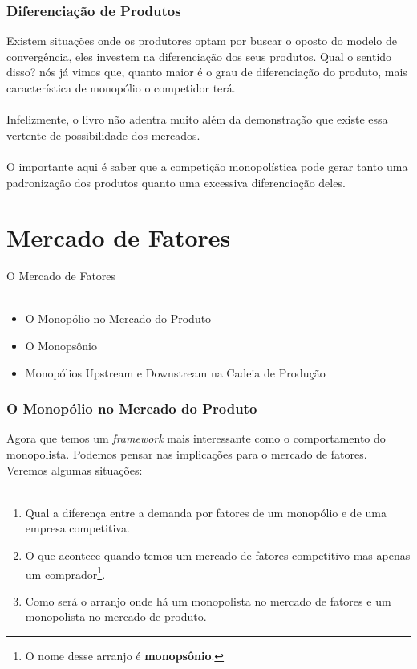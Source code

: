 \documentclass{beamer}[10]
\begin{document}

\begin{frame}
	\frametitle{Diferenciação de Produtos}

	Existem situações onde os produtores optam por buscar o oposto do modelo de convergência, eles investem na diferenciação dos seus produtos. Qual o sentido disso? nós já vimos que, quanto maior é o grau de diferenciação do produto, mais característica de monopólio o competidor terá.
	\\~\\
	Infelizmente, o livro não adentra muito além da demonstração que existe essa vertente de possibilidade dos mercados.
	\\~\\
	O importante aqui é saber que a competição monopolística pode gerar tanto uma padronização dos produtos quanto uma excessiva diferenciação deles.

\end{frame}

\section[M.Fatores]{Mercado de Fatores}

\begin{frame}
	\huge O Mercado de Fatores \normalsize
	\\~\\
	\begin{itemize}
		\item O Monopólio no Mercado do Produto
		\item O Monopsônio
		\item Monopólios Upstream e Downstream na Cadeia de Produção
	\end{itemize}
\end{frame}

\begin{frame}
	\frametitle{O Monopólio no Mercado do Produto}

	Agora que temos um \textit{framework} mais interessante como o comportamento do monopolista. Podemos pensar nas implicações para o mercado de fatores. Veremos algumas situações:
	\\~\\
	\begin{enumerate}
		\item Qual a diferença entre a demanda por fatores de um monopólio e de uma empresa competitiva.
	
		\item O que acontece quando temos um mercado de fatores competitivo mas apenas um comprador\footnote{O nome desse arranjo é \textbf{monopsônio}.}.
	
		\item Como será o arranjo onde há um monopolista no mercado de fatores e um monopolista no mercado de produto.
	\end{enumerate}
\end{frame}
\end{document}
